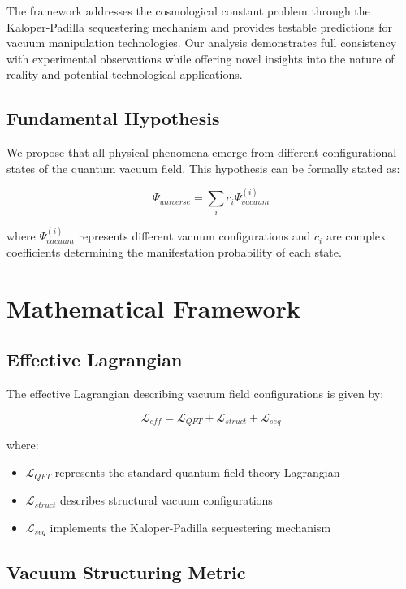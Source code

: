 \documentclass[12pt,a4paper]{article}
\begin{document}
The framework addresses the cosmological constant problem through the Kaloper-Padilla sequestering mechanism and provides testable predictions for vacuum manipulation technologies. Our analysis demonstrates full consistency with experimental observations while offering novel insights into the nature of reality and potential technological applications.

\subsection{Fundamental Hypothesis}

We propose that all physical phenomena emerge from different configurational states of the quantum vacuum field. This hypothesis can be formally stated as:

\begin{equation}
\Psi_{universe} = \sum_{i} c_i \Psi_{vacuum}^{(i)}
\end{equation}

where $\Psi_{vacuum}^{(i)}$ represents different vacuum configurations and $c_i$ are complex coefficients determining the manifestation probability of each state.

\section{Mathematical Framework}

\subsection{Effective Lagrangian}

The effective Lagrangian describing vacuum field configurations is given by:

\begin{equation}
\mathcal{L}_{eff} = \mathcal{L}_{QFT} + \mathcal{L}_{struct} + \mathcal{L}_{seq}
\end{equation}

where:
\begin{itemize}
    \item $\mathcal{L}_{QFT}$ represents the standard quantum field theory Lagrangian
    \item $\mathcal{L}_{struct}$ describes structural vacuum configurations
    \item $\mathcal{L}_{seq}$ implements the Kaloper-Padilla sequestering mechanism
\end{itemize}

\subsection{Vacuum Structuring Metric}
\end{document}
